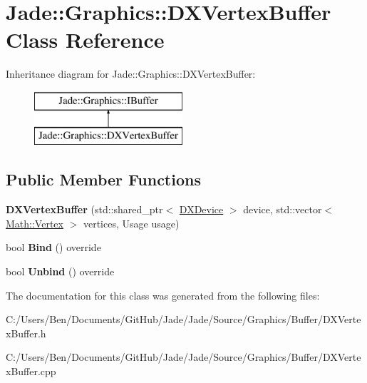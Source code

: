 \hypertarget{class_jade_1_1_graphics_1_1_d_x_vertex_buffer}{}\section{Jade\+:\+:Graphics\+:\+:D\+X\+Vertex\+Buffer Class Reference}
\label{class_jade_1_1_graphics_1_1_d_x_vertex_buffer}
Inheritance diagram for Jade\+:\+:Graphics\+:\+:D\+X\+Vertex\+Buffer\+:\begin{figure}[H]
\begin{center}
\leavevmode
\includegraphics[height=2.000000cm]{class_jade_1_1_graphics_1_1_d_x_vertex_buffer}
\end{center}
\end{figure}
\subsection*{Public Member Functions}
\begin{DoxyCompactItemize}
\item 
\hypertarget{class_jade_1_1_graphics_1_1_d_x_vertex_buffer_af84f5c02cb2e8c1230a9a1386aca401f}{}{\bfseries D\+X\+Vertex\+Buffer} (std\+::shared\+\_\+ptr$<$ \hyperlink{class_jade_1_1_graphics_1_1_d_x_device}{D\+X\+Device} $>$ device, std\+::vector$<$ \hyperlink{struct_jade_1_1_math_1_1_vertex}{Math\+::\+Vertex} $>$ vertices, Usage usage)\label{class_jade_1_1_graphics_1_1_d_x_vertex_buffer_af84f5c02cb2e8c1230a9a1386aca401f}

\item 
\hypertarget{class_jade_1_1_graphics_1_1_d_x_vertex_buffer_a8bf9ff2087fc6c082ce93ba0d4cf9d54}{}bool {\bfseries Bind} () override\label{class_jade_1_1_graphics_1_1_d_x_vertex_buffer_a8bf9ff2087fc6c082ce93ba0d4cf9d54}

\item 
\hypertarget{class_jade_1_1_graphics_1_1_d_x_vertex_buffer_a9a35d39bdc9a7ad88890f1939317511b}{}bool {\bfseries Unbind} () override\label{class_jade_1_1_graphics_1_1_d_x_vertex_buffer_a9a35d39bdc9a7ad88890f1939317511b}

\end{DoxyCompactItemize}


The documentation for this class was generated from the following files\+:\begin{DoxyCompactItemize}
\item 
C\+:/\+Users/\+Ben/\+Documents/\+Git\+Hub/\+Jade/\+Jade/\+Source/\+Graphics/\+Buffer/D\+X\+Vertex\+Buffer.\+h\item 
C\+:/\+Users/\+Ben/\+Documents/\+Git\+Hub/\+Jade/\+Jade/\+Source/\+Graphics/\+Buffer/D\+X\+Vertex\+Buffer.\+cpp\end{DoxyCompactItemize}
